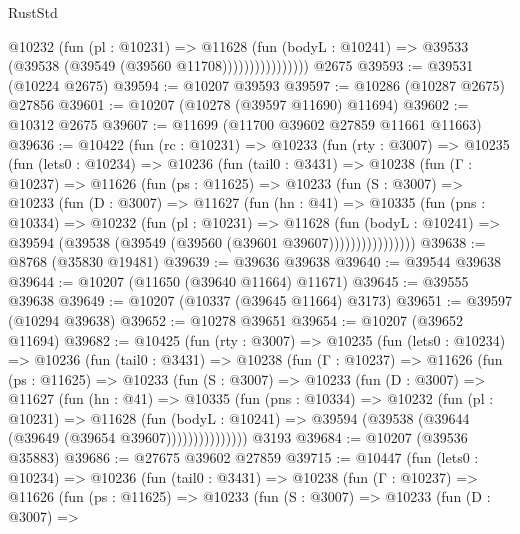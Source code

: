 \begin{lexlean}{RustStd}
\begin{coremodule}
                        @10232
                          (fun (pl : @10231) =>
                          @11628
                            (fun (bodyL : @10241) =>
                            @39533 (@39538 (@39549 (@39560 @11708))))))))))))))))
    @2675
@39593 := @39531 (@10224 @2675)
@39594 := @10207 @39593
@39597 := @10286 (@10287 @2675) @27856
@39601 := @10207 (@10278 (@39597 @11690) @11694)
@39602 := @10312 @2675
@39607 := @11699 (@11700 @39602 @27859 @11661 @11663)
@39636 := @10422
    (fun (rc : @10231) =>
    @10233
      (fun (rty : @3007) =>
      @10235
        (fun (lets0 : @10234) =>
        @10236
          (fun (tail0 : @3431) =>
          @10238
            (fun (Γ : @10237) =>
            @11626
              (fun (ps : @11625) =>
              @10233
                (fun (S : @3007) =>
                @10233
                  (fun (D : @3007) =>
                  @11627
                    (fun (hn : @41) =>
                    @10335
                      (fun (pns : @10334) =>
                      @10232
                        (fun (pl : @10231) =>
                        @11628
                          (fun (bodyL : @10241) =>
                          @39594 (@39538 (@39549 (@39560 (@39601 @39607))))))))))))))))
@39638 := @8768 (@35830 @19481)
@39639 := @39636 @39638
@39640 := @39544 @39638
@39644 := @10207 (@11650 (@39640 @11664) @11671)
@39645 := @39555 @39638
@39649 := @10207 (@10337 (@39645 @11664) @3173)
@39651 := @39597 (@10294 @39638)
@39652 := @10278 @39651
@39654 := @10207 (@39652 @11694)
@39682 := @10425
    (fun (rty : @3007) =>
    @10235
      (fun (lets0 : @10234) =>
      @10236
        (fun (tail0 : @3431) =>
        @10238
          (fun (Γ : @10237) =>
          @11626
            (fun (ps : @11625) =>
            @10233
              (fun (S : @3007) =>
              @10233
                (fun (D : @3007) =>
                @11627
                  (fun (hn : @41) =>
                  @10335
                    (fun (pns : @10334) =>
                    @10232
                      (fun (pl : @10231) =>
                      @11628
                        (fun (bodyL : @10241) =>
                        @39594 (@39538 (@39644 (@39649 (@39654 @39607)))))))))))))))
    @3193
@39684 := @10207 (@39536 @35883)
@39686 := @27675 @39602 @27859
@39715 := @10447
    (fun (lets0 : @10234) =>
    @10236
      (fun (tail0 : @3431) =>
      @10238
        (fun (Γ : @10237) =>
        @11626
          (fun (ps : @11625) =>
          @10233
            (fun (S : @3007) =>
            @10233
              (fun (D : @3007) =>

\end{coremodule}
\end{lexlean}
